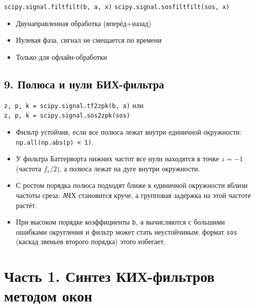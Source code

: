 \documentclass[12pt,a4paper,openany]{book}
\providecommand{\tightlist}{\setlength{\itemsep}{0pt}\setlength{\parskip}{0pt}}
\begin{document}
\texttt{scipy.\allowbreak{}signal.\allowbreak{}filtfilt(\allowbreak{}b,\allowbreak{}\ a,\allowbreak{}\ x)}
\texttt{scipy.\allowbreak{}signal.\allowbreak{}sosfiltfilt(\allowbreak{}sos,\allowbreak{}\ x)}

\begin{itemize}
\tightlist
\item
  Двунаправленная обработка (вперёд+назад)
\item
  Нулевая фаза, сигнал не смещается по времени
\item
  Только для офлайн-обработки
\end{itemize}

\subsection*{9. Полюса и нули БИХ-фильтра}

\texttt{z,\allowbreak{}\ p,\allowbreak{}\ k\ =\allowbreak{}\ scipy.\allowbreak{}signal.\allowbreak{}tf2zpk(\allowbreak{}b,\allowbreak{}\ a)} или \texttt{z,\allowbreak{}\ p,\allowbreak{}\ k\ =\allowbreak{}\ scipy.\allowbreak{}signal.\allowbreak{}sos2zpk(\allowbreak{}sos)}

\begin{itemize}
\tightlist
\item
  Фильтр устойчив, если все полюса лежат внутри единичной окружности: \texttt{np.\allowbreak{}all(\allowbreak{}np.\allowbreak{}abs(\allowbreak{}p)\ \textless{}\ 1)}.
\item
  У фильтра Баттерворта нижних частот все нули находятся в точке \(z = -1\) (частота \(f_s/2\)), а полюса лежат на дуге внутри окружности.
\item
  С ростом порядка полюса подходят ближе к единичной окружности вблизи частоты среза: АЧХ становится круче, а групповая задержка на этой частоте растёт.
\item
  При высоком порядке коэффициенты \texttt{b}, \texttt{a} вычисляются с большими ошибками округления и фильтр может стать неустойчивым; формат \texttt{\textquotesingle{}\allowbreak{}sos\textquotesingle{}\allowbreak{}} (каскад звеньев второго порядка) этого избегает.
\end{itemize}

\section*{Часть 1. Синтез КИХ-фильтров методом окон}
\end{document}
